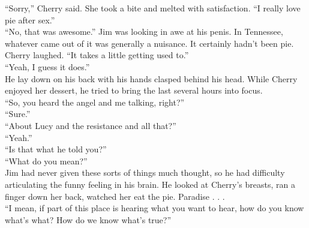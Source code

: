 \enquote{Sorry,} Cherry said.  She took a bite and melted with satisfaction.  \enquote{I really love pie after sex.}\\



\enquote{No, that was awesome.}  Jim was looking in awe at his penis.  In Tennessee, whatever came out of it was generally a nuisance.  It certainly hadn't been pie.\\



Cherry laughed.  \enquote{It takes a little getting used to.}\\



\enquote{Yeah, I guess it does.}\\



He lay down on his back with his hands clasped behind his head.  While Cherry enjoyed her dessert, he tried to bring the last several hours into focus.\\



\enquote{So, you heard the angel and me talking, right?}\\



\enquote{Sure.}\\



\enquote{About Lucy and the resistance and all that?}\\



\enquote{Yeah.}\\



\enquote{Is that what he told you?}\\



\enquote{What do you mean?}\\



Jim had never given these sorts of things much thought, so he had difficulty articulating the funny feeling in his brain.  He looked at Cherry's breasts, ran a finger down her back, watched her eat the pie.  Paradise . . .\\



\enquote{I mean, if part of this place is hearing what you want to hear, how do you know what's what?  How do we know what's true?}\\



